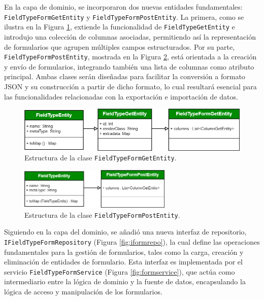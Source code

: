 \documentclass[12pt, a4paper]{book}
\begin{document}
En la capa de dominio, se incorporaron dos nuevas entidades fundamentales: \texttt{FieldTypeFormGetEntity} y \texttt{FieldTypeFormPostEntity}. La primera, como se ilustra en la Figura \ref{fig:fieldtypeformgetentity}, extiende la funcionalidad de \texttt{FieldTypeGetEntity} e introdujo una colección de columnas asociadas, permitiendo así la representación de formularios que agrupen múltiples campos estructurados. Por su parte, \texttt{FieldTypeFormPostEntity}, mostrada en la Figura \ref{fig:fieldtypeformpostentity}, está orientada a la creación y envío de formularios, integrando también una lista de columnas como atributo principal. Ambas clases serán diseñadas para facilitar la conversión a formato JSON y su construcción a partir de dicho formato, lo cual resultará esencial para las funcionalidades relacionadas con la exportación e importación de datos.

\begin{figure}[H]
  \centering
  \includegraphics[width=\textwidth]{images/fieldtypeform_get_entity.png}
  \caption{Estructura de la clase \texttt{FieldTypeFormGetEntity}.}
  \label{fig:fieldtypeformgetentity}
\end{figure}

\begin{figure}[H]
  \centering
  \includegraphics[width=0.65\textwidth]{images/fieldtypeform_post_entity.png}
  \caption{Estructura de la clase \texttt{FieldTypeFormPostEntity}.}
  \label{fig:fieldtypeformpostentity}
\end{figure}

Siguiendo en la capa del dominio, se añadió una nueva interfaz de repositorio, \texttt{IFieldTypeFormRepository} (Figura \ref{fig:iformrepo}), la cual define las operaciones fundamentales para la gestión de formularios, tales como la carga, creación y eliminación de entidades de formulario. Esta interfaz es implementada por el servicio \texttt{FieldTypeFormService} (Figura \ref{fig:formservice}), que actúa como intermediario entre la lógica de dominio y la fuente de datos, encapsulando la lógica de acceso y manipulación de los formularios.
\end{document}
